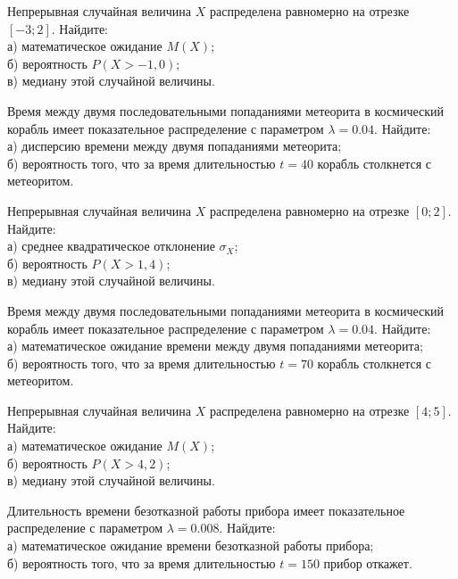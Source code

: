 \vfill

\newpage\setcounter{zad}{0}

\z Непрерывная случайная величина $X$ распределена равномерно на отрезке $[-3; 2]$. Найдите: \\ \quad а) математическое ожидание $M(X)$; \\ \quad б) вероятность $P(X>-1{,}0)$; \\ \quad в) медиану этой случайной величины.


\vfill

\z Время между двумя последовательными попаданиями метеорита в космический корабль имеет показательное распределение с параметром $\lambda = 0.04$. Найдите: \\ \quad а) дисперсию времени между двумя попаданиями метеорита; \\ \quad б) вероятность того, что за время длительностью $t = 40$ корабль  столкнется с метеоритом.
 

\vfill

\newpage\setcounter{zad}{0}

\z Непрерывная случайная величина $X$ распределена равномерно на отрезке $[0; 2]$. Найдите: \\ \quad а) среднее квадратическое отклонение $\sigma_X$; \\ \quad б) вероятность $P(X>1{,}4)$; \\ \quad в) медиану этой случайной величины.


\vfill

\z Время между двумя последовательными попаданиями метеорита в космический корабль имеет показательное распределение с параметром $\lambda = 0.04$. Найдите: \\ \quad а) математическое ожидание времени между двумя попаданиями метеорита; \\ \quad б) вероятность того, что за время длительностью $t = 70$ корабль  столкнется с метеоритом.
 

\vfill

\newpage\setcounter{zad}{0}

\z Непрерывная случайная величина $X$ распределена равномерно на отрезке $[4; 5]$. Найдите: \\ \quad а) математическое ожидание $M(X)$; \\ \quad б) вероятность $P(X>4{,}2)$; \\ \quad в) медиану этой случайной величины.


\vfill

\z Длительность времени безотказной работы прибора имеет показательное распределение с параметром $\lambda = 0.008$. Найдите: \\ \quad а) математическое ожидание времени безотказной работы прибора; \\ \quad б) вероятность того, что за время длительностью $t = 150$ прибор  откажет.
 

